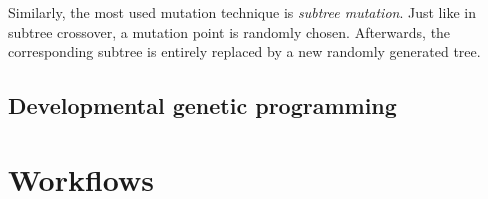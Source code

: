 Similarly, the most used mutation technique is \textit{subtree mutation}.
Just like in subtree crossover, a mutation point is randomly chosen.
Afterwards, the corresponding subtree is entirely replaced by a new randomly
generated tree.

\subsection{Developmental genetic programming}

\section{Workflows}